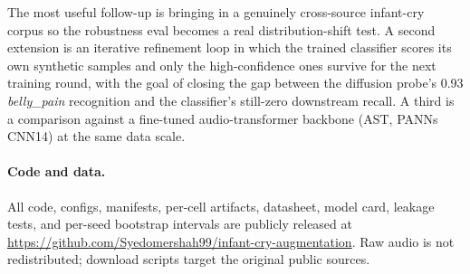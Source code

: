 \documentclass[10pt]{article}
\begin{document}
The most useful follow-up is bringing in a genuinely cross-source infant-cry corpus so the robustness eval becomes a real distribution-shift test. A second extension is an iterative refinement loop in which the trained classifier scores its own synthetic samples and only the high-confidence ones survive for the next training round, with the goal of closing the gap between the diffusion probe's 0.93 \textit{belly\_pain} recognition and the classifier's still-zero downstream recall. A third is a comparison against a fine-tuned audio-transformer backbone (AST, PANNs CNN14) at the same data scale.

\paragraph{Code and data.} All code, configs, manifests, per-cell artifacts, datasheet, model card, leakage tests, and per-seed bootstrap intervals are publicly released at \url{https://github.com/Syedomershah99/infant-cry-augmentation}. Raw audio is not redistributed; download scripts target the original public sources.



\end{document}
